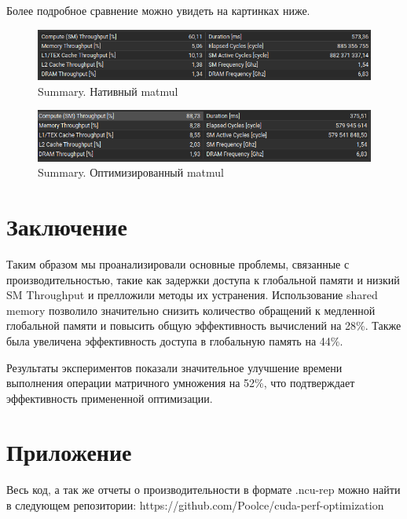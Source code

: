 \documentclass[a4paper,12pt]{article}
\begin{document}
\newpage
Более подробное сравнение можно увидеть на картинках ниже.

\begin{figure}[h]
  \centering
  \includegraphics[width=1.0\textwidth]{img/native_summary.png}
  \caption{Summary. Нативный matmul}
  \label{fig:image_label}
\end{figure}

\begin{figure}[h]
  \centering
  \includegraphics[width=1.0\textwidth]{img/optimized_summary.png}
  \caption{Summary. Оптимизированный matmul}
  \label{fig:image_label}
\end{figure}

\newpage
\section{Заключение}

Таким образом мы проанализировали основные проблемы, связанные с производительностью, 
такие как задержки доступа к глобальной памяти и низкий SM Throughput
и прелложили методы их устранения. Использование shared memory позволило 
значительно снизить количество обращений к медленной глобальной памяти и повысить общую эффективность вычислений
на 28\%. Также была увеличена эффективность доступа в глобальную память на 44\%.

Результаты экспериментов показали значительное улучшение времени выполнения операции матричного 
умножения на 52\%, что подтверждает эффективность примененной оптимизации. 

\section{Приложение}

Весь код, а так же отчеты о производительности в формате .ncu-rep можно найти в следующем репозитории: https://github.com/Poolce/cuda-perf-optimization
\end{document}
